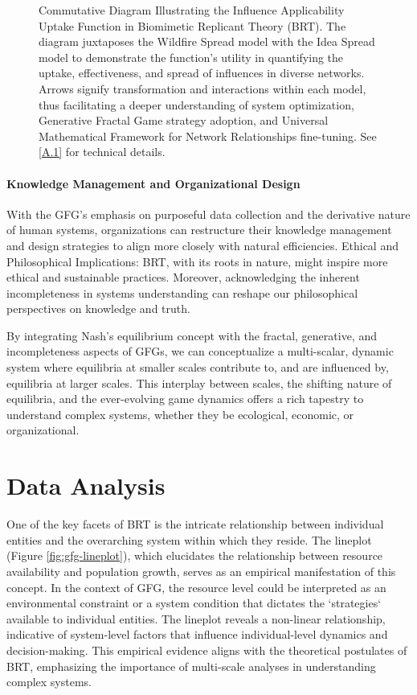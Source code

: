 \documentclass[sn-nature]{sn-jnl}%
\theoremstyle{thmstyleone}%
\theoremstyle{thmstyletwo}%
\theoremstyle{thmstylethree}%
\begin{document}
\begin{figure}[h!]
\begin{minipage}{0.5\textwidth}
\end{minipage}
\label{marker}
\caption[Influence Applicability Uptake Function Diagram]{Commutative Diagram Illustrating the Influence Applicability Uptake Function in Biomimetic Replicant Theory (BRT). The diagram juxtaposes the Wildfire Spread model with the Idea Spread model to demonstrate the function's utility in quantifying the uptake, effectiveness, and spread of influences in diverse networks. Arrows signify transformation and interactions within each model, thus facilitating a deeper understanding of system optimization, Generative Fractal Game strategy adoption, and Universal Mathematical Framework for Network Relationships fine-tuning. See \ref{A.1} for technical details.}
\end{figure}



\paragraph{Knowledge Management and Organizational Design}
With the GFG's emphasis on purposeful data collection and the derivative nature of human systems, organizations can restructure their knowledge management and design strategies to align more closely with natural efficiencies\cite{neveu_dealing_2019}.
Ethical and Philosophical Implications:
BRT, with its roots in nature, might inspire more ethical and sustainable practices. Moreover, acknowledging the inherent incompleteness in systems understanding can reshape our philosophical perspectives on knowledge and truth.



By integrating Nash's equilibrium concept with the fractal, generative, and incompleteness aspects of GFGs, we can conceptualize a multi-scalar, dynamic system where equilibria at smaller scales contribute to, and are influenced by, equilibria at larger scales. This interplay between scales, the shifting nature of equilibria, and the ever-evolving game dynamics offers a rich tapestry to understand complex systems, whether they be ecological, economic, or organizational.

\section{Data Analysis}

One of the key facets of BRT is the intricate relationship between individual entities and the overarching system within which they reside. The lineplot (Figure \ref{fig:gfg-lineplot}), which elucidates the relationship between resource availability and population growth, serves as an empirical manifestation of this concept\cite{whiteside_data_2019}. In the context of GFG, the resource level could be interpreted as an environmental constraint or a system condition that dictates the `strategies` available to individual entities. The lineplot reveals a non-linear relationship, indicative of system-level factors that influence individual-level dynamics and decision-making. This empirical evidence aligns with the theoretical postulates of BRT, emphasizing the importance of multi-scale analyses in understanding complex systems.
\end{document}
